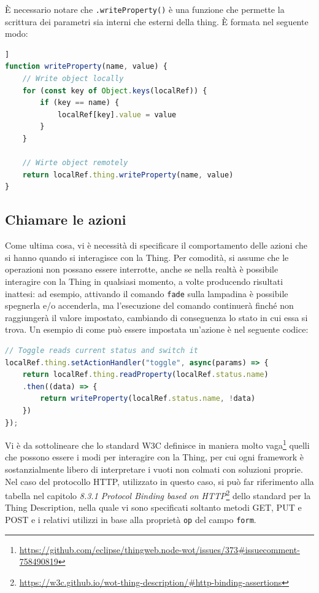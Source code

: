 \documentclass[12pt,a4paper,openright,oneside]{report}
\begin{document}
È necessario notare che \texttt{.writeProperty()} è una funzione che permette la scrittura dei parametri sia interni che esterni della thing. È formata nel seguente modo:

\begin{lstlisting}[language=JavaScript]]
function writeProperty(name, value) {
	// Write object locally
	for (const key of Object.keys(localRef)) {
		if (key == name) {
			localRef[key].value = value
		}
	}
	
	// Wirte object remotely
	return localRef.thing.writeProperty(name, value)
}
\end{lstlisting}


\subsection{Chiamare le azioni}
Come ultima cosa, vi è necessità di specificare il comportamento delle azioni che si hanno quando si interagisce con la Thing. Per comodità, si assume che le operazioni non possano essere interrotte, anche se nella realtà è possibile interagire con la Thing in qualsiasi momento, a volte producendo risultati inattesi: ad esempio, attivando il comando \texttt{fade} sulla lampadina è possibile spegnerla e/o accenderla, ma l'esecuzione del comando continuerà finché non raggiungerà il valore impostato, cambiando di conseguenza lo stato in cui essa si trova. Un esempio di come può essere impostata un'azione è nel seguente codice:

\begin{lstlisting}[language=JavaScript,caption={Reagire all'invocazione dell'azione in \texttt{bulb.js}}]
// Toggle reads current status and switch it
localRef.thing.setActionHandler("toggle", async(params) => {
	return localRef.thing.readProperty(localRef.status.name)
	.then((data) => {
		return writeProperty(localRef.status.name, !data)
	})
});
\end{lstlisting}


Vi è da sottolineare che lo standard W3C definisce in maniera molto vaga\footnote{\url{https://github.com/eclipse/thingweb.node-wot/issues/373\#issuecomment-758490819}} quelli che possono essere i modi per interagire con la Thing, per cui ogni framework è sostanzialmente libero di interpretare i vuoti non colmati con soluzioni proprie. Nel caso del protocollo HTTP, utilizzato in questo caso, si può far riferimento alla tabella nel capitolo \textit{8.3.1 Protocol Binding based on HTTP}\footnote{\url{https://w3c.github.io/wot-thing-description/\#http-binding-assertions}} dello standard per la Thing Description, nella quale vi sono specificati soltanto metodi GET, PUT e POST e i relativi utilizzi in base alla proprietà \texttt{op} del campo \texttt{form}.\\
\end{document}
